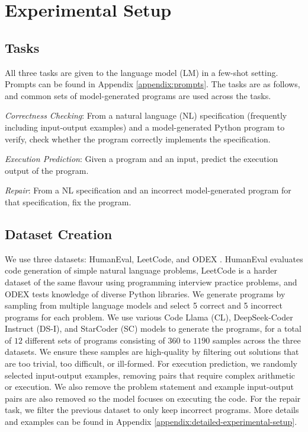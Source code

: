 \section{Experimental Setup}
\subsection{Tasks}
All three tasks are given to the language model (LM) in a few-shot setting. Prompts can be found in Appendix \ref{appendix:prompts}. The tasks are as follows, and common sets of model-generated programs are used across the tasks.

\textit{Correctness Checking}: From a natural language (NL) specification (frequently including input-output examples) and a model-generated Python program to verify, check whether the program correctly implements the specification.

\textit{Execution Prediction}: Given a program and an input, predict the execution output of the program.

\textit{Repair}: From a NL specification and an incorrect model-generated program for that specification, fix the program.

\subsection{Dataset Creation}
We use three datasets: HumanEval, LeetCode, and ODEX \citep{wang2022execution}. HumanEval evaluates code generation of simple natural language problems, LeetCode is a harder dataset of the same flavour using programming interview practice problems, and ODEX tests knowledge of diverse Python libraries. We generate programs by sampling from multiple language models and select 5 correct and 5 incorrect programs for each problem. We use various Code Llama (CL), DeepSeek-Coder Instruct (DS-I), and StarCoder (SC) models to generate the programs, for a total of $12$ different sets of programs consisting of $360$ to $1190$ samples across the three datasets. We ensure these samples are high-quality by filtering out solutions that are too trivial, too difficult, or ill-formed. For execution prediction, we randomly selected input-output examples, removing pairs that require complex arithmetic or execution. We also remove the problem statement and example input-output pairs are also removed so the model focuses on executing the code. For the repair task, we filter the previous dataset to only keep incorrect programs. More details and examples can be found in Appendix \ref{appendix:detailed-experimental-setup}.

